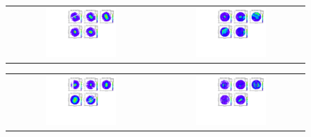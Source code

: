 \begin{figure}[ht]
	\centering
    \begin{tabular}{cc}
	    \includegraphics[width=0.5\textwidth]{Spacepoint_tripets_Up.pdf} &	
        \includegraphics[width=0.5\textwidth]{Spacepoint_Doublets_Up.pdf} \\
    \end{tabular}
	\caption{\label{SP_US}}
\end{figure}

\begin{figure}[ht]
	\centering
    \begin{tabular}{cc}
	    \includegraphics[width=0.5\textwidth]{Spacepoint_tripets_Down.pdf} &	
        \includegraphics[width=0.5\textwidth]{Spacepoint_Doublets_Down.pdf} \\
    \end{tabular}
	\caption{\label{SP_DS}}
\end{figure}

